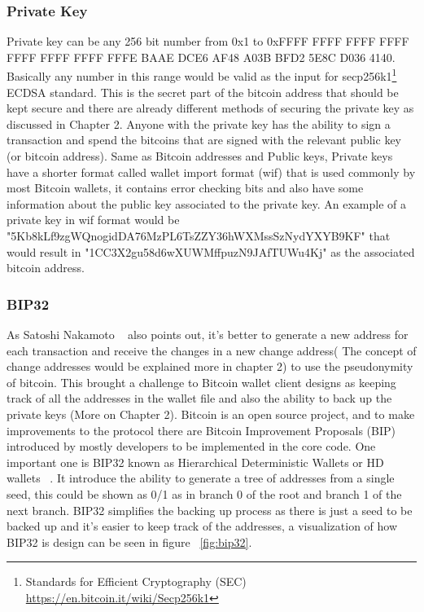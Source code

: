 \subsubsection{Private Key}
Private key can be any 256 bit number from 0x1 to 0xFFFF FFFF FFFF FFFF FFFF FFFF FFFF FFFE BAAE DCE6 AF48 A03B BFD2 5E8C D036 4140. Basically any number in this range would be valid as the input for secp256k1\footnote{Standards for Efficient Cryptography (SEC) \url{https://en.bitcoin.it/wiki/Secp256k1}} ECDSA standard. This is the secret part of the bitcoin address that should be kept secure and there are already different methods of securing the private key as discussed in Chapter 2. Anyone with the private key has the ability to sign a transaction and spend the bitcoins that are signed with the relevant public key (or bitcoin address). 
Same as Bitcoin addresses and Public keys, Private keys have a shorter format called wallet import format (wif) that is used commonly by most Bitcoin wallets, it contains error checking bits and also have some information about the public key associated to the private key. An example of a private key in wif format would be "5Kb8kLf9zgWQnogidDA76MzPL6TsZZY36hWXMssSzNydYXYB9KF" that would result in "1CC3X2gu58d6wXUWMffpuzN9JAfTUWu4Kj" as the associated bitcoin address.



\subsubsection{BIP32}
As Satoshi Nakamoto ~\cite{Nak08} also points out, it's better to generate a new address for each transaction and receive the changes in a new change address( The concept of change addresses would be explained more in chapter 2) to use the pseudonymity of bitcoin. This brought a challenge to Bitcoin wallet client designs as keeping track of all the addresses in the wallet file and also the ability to back up the private keys (More on Chapter 2). 
Bitcoin is an open source project, and to make improvements to the protocol there are Bitcoin Improvement Proposals (BIP) introduced by mostly developers to be implemented in the core code. One important one is BIP32 known as Hierarchical Deterministic Wallets or HD wallets ~\cite{bip32}. It introduce the ability to generate a tree of addresses from a single seed, this could be shown as 0/1 as in branch 0 of the root and branch 1 of the next branch. BIP32 simplifies the backing up process as there is just a seed to be backed up and it's easier to keep track of the addresses, a visualization of how BIP32 is design can be seen in figure ~\ref{fig:bip32}.

